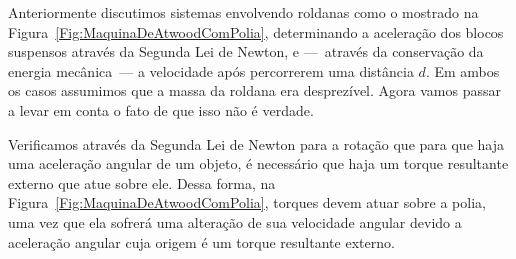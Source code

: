 Anteriormente discutimos sistemas envolvendo roldanas como o mostrado na Figura~\ref{Fig:MaquinaDeAtwoodComPolia}, determinando a aceleração dos blocos suspensos através da Segunda Lei de Newton, e ---~através da conservação da energia mecânica~--- a velocidade após percorrerem uma distância $d$. Em ambos os casos assumimos que a massa da roldana era desprezível. Agora vamos passar a levar em conta o fato de que isso não é verdade.

Verificamos através da Segunda Lei de Newton para a rotação que para que haja uma aceleração angular de um objeto, é necessário que haja um torque resultante externo que atue sobre ele. Dessa forma, na Figura~\ref{Fig:MaquinaDeAtwoodComPolia}, torques devem atuar sobre a polia, uma vez que ela sofrerá uma alteração de sua velocidade angular devido a aceleração angular cuja origem é um torque resultante externo.

